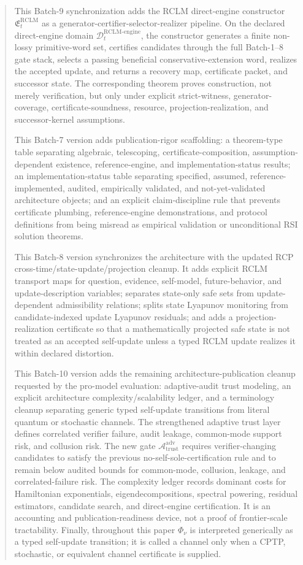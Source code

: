\documentclass[11pt,a4paper]{article}
\newcommand{\Acal}{\mathcal A}
\newcommand{\Dcal}{\mathcal D}
\newcommand{\adv}{\mathrm{adv}}
\newcommand{\RCLM}{\mathrm{RCLM}}
\newcommand{\trust}{\mathrm{trust}}
\newcommand{\engine}{\mathrm{engine}}
\begin{document}
\begin{abstract}
This Batch-9 synchronization adds the RCLM direct-engine constructor \(\mathfrak E_t^{\RCLM}\) as a generator-certifier-selector-realizer pipeline.  On the declared direct-engine domain \(\Dcal_t^{\RCLM\text{-}\engine}\), the constructor generates a finite non-lossy primitive-word set, certifies candidates through the full Batch-1--8 gate stack, selects a passing beneficial conservative-extension word, realizes the accepted update, and returns a recovery map, certificate packet, and successor state.  The corresponding theorem proves construction, not merely verification, but only under explicit strict-witness, generator-coverage, certificate-soundness, resource, projection-realization, and successor-kernel assumptions.

This Batch-7 version adds publication-rigor scaffolding: a theorem-type table separating algebraic, telescoping, certificate-composition, assumption-dependent existence, reference-engine, and implementation-status results; an implementation-status table separating specified, assumed, reference-implemented, audited, empirically validated, and not-yet-validated architecture objects; and an explicit claim-discipline rule that prevents certificate plumbing, reference-engine demonstrations, and protocol definitions from being misread as empirical validation or unconditional RSI solution theorems.

This Batch-8 version synchronizes the architecture with the updated RCP cross-time/state-update/projection cleanup. It adds explicit RCLM transport maps for question, evidence, self-model, future-behavior, and update-description variables; separates state-only safe sets from update-dependent admissibility relations; splits state Lyapunov monitoring from candidate-indexed update Lyapunov residuals; and adds a projection-realization certificate so that a mathematically projected safe state is not treated as an accepted self-update unless a typed RCLM update realizes it within declared distortion.


This Batch-10 version adds the remaining architecture-publication cleanup requested by the pro-model evaluation: adaptive-audit trust modeling, an explicit architecture complexity/scalability ledger, and a terminology cleanup separating generic typed self-update transitions from literal quantum or stochastic channels.  The strengthened adaptive trust layer defines correlated verifier failure, audit leakage, common-mode support risk, and collusion risk.  The new gate \(\Acal_{\trust}^{\adv}\) requires verifier-changing candidates to satisfy the previous no-self-sole-certification rule and to remain below audited bounds for common-mode, collusion, leakage, and correlated-failure risk.  The complexity ledger records dominant costs for Hamiltonian exponentials, eigendecompositions, spectral powering, residual estimators, candidate search, and direct-engine certification.  It is an accounting and publication-readiness device, not a proof of frontier-scale tractability.  Finally, throughout this paper \(\Phi_\nu\) is interpreted generically as a typed self-update transition; it is called a channel only when a CPTP, stochastic, or equivalent channel certificate is supplied.



\end{abstract}
\end{document}
